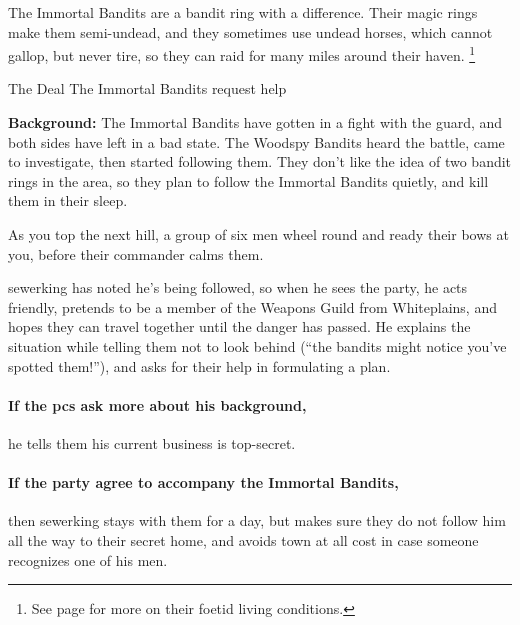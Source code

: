 \resumecontents[Town]

\stopcontents[sq]


\stopcontents[Town]

\startcontents[sq]

\sqminitoc

\noindent
The Immortal Bandits are a bandit ring with a difference.
Their magic rings make them semi-undead, and they sometimes use undead horses, which cannot gallop, but never tire, so they can raid for many miles around their haven.%
\footnote{See page \pageref{necromancers_lair} for more on their foetid living conditions.}

{The Deal}%
{The Immortal Bandits request help}%

\textbf{Background:}
The Immortal Bandits have gotten in a fight with the \gls{guard}, and both sides have left in a bad state.
The Woodspy Bandits heard the battle, came to investigate, then started following them.
They don't like the idea of two bandit rings in the area, so they plan to follow the Immortal Bandits quietly, and kill them in their sleep.

\begin{boxtext}

  As you top the next hill, a group of six men wheel round and ready their bows at you, before their commander calms them.

\end{boxtext}

\Gls{sewerking} has noted he's being followed, so when he sees the party, he acts friendly, pretends to be a member of the Weapons Guild from Whiteplains, and hopes they can travel together until the danger has passed.
He explains the situation while telling them not to look behind (``the bandits might notice you've spotted them!''), and asks for their help in formulating a plan.

\paragraph{If the \glspl{pc} ask more about his background,}
he tells them his current business is top-secret.


\sewerking


\paragraph{If the party agree to accompany the Immortal Bandits,}
then \gls{sewerking} stays with them for a day, but makes sure they do not follow him all the way to their secret home, and avoids town at all cost in case someone recognizes one of his men.

